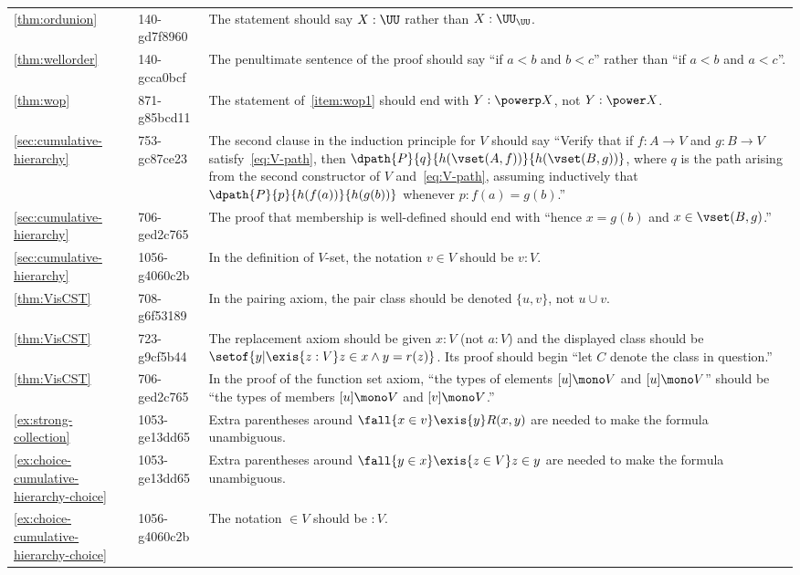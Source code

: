 \documentclass[
%
%
11pt %
]{article}
\begin{document}
\begin{longtable}{llp{10.5cm}}
  \cref{thm:ordunion}
  & 140-gd7f8960
  & The statement should say $X:\UU$ rather than $X:\UU_\UU$.\\
  \cref{thm:wellorder}
  & 140-gcca0bcf
  & The penultimate sentence of the proof should say ``if $a<b$ and $b<c$'' rather than ``if $a<b$ and $a<c$''.\\
  \cref{thm:wop}
  & 871-g85bcd11
  & The statement of~\ref{item:wop1} should end with $Y:\powerp X$, not $Y:\power X$.\\
  \cref{sec:cumulative-hierarchy}
  & 753-gc87ce23
  & The second clause in the induction principle for $V$ should say ``Verify that if $f : A \to V$ and $g : B \to V$ satisfy~\eqref{eq:V-path}, then $\dpath{P}{q}{h(\vset(A,f))}{h(\vset(B,g))}$, where $q$ is the path arising from the second constructor of $V$ and~\eqref{eq:V-path}, assuming inductively that $\dpath{P}{p}{h(f(a))}{h(g(b))}$ whenever $p:f(a)=g(b)$.''\\
  \cref{sec:cumulative-hierarchy}
  & 706-ged2c765
  & The proof that membership is well-defined should end with ``hence $x = g(b)$ and $x \in \vset(B,g)$.''\\
  \cref{sec:cumulative-hierarchy}
  & 1056-g4060c2b
  & In the definition of $V$-set, the notation $v \in V$ should be $v:V$.\\
  \cref{thm:VisCST}
  & 708-g6f53189
  & In the pairing axiom, the pair class should be denoted $\{u, v\}$, not $u\cup v$.\\
  \cref{thm:VisCST}
  & 723-g9cf5b44
  & The replacement axiom should be given $x : V$ (not $a : V$) and the displayed class should be $\setof{ y | \exis{z : V} z \in x \land y = r(z)}$.
  Its proof should begin ``let $C$ denote the class in question.''\\
  \cref{thm:VisCST}
  & 706-ged2c765
  & In the proof of the function set axiom, ``the types of elements $[u] \mono V$ and $[u] \mono V$'' should be ``the types of members $[u] \mono V$ and $[v] \mono V$.''\\
  \cref{ex:strong-collection}
  & 1053-ge13dd65
  & Extra parentheses around $\fall{x\in v}\exis{y} R(x,y)$ are needed to make the formula unambiguous.\\
  \cref{ex:choice-cumulative-hierarchy-choice}
  & 1053-ge13dd65
  & Extra parentheses around $\fall{y\in x}\exis{z\in V} z\in y$ are needed to make the formula unambiguous.\\
  \cref{ex:choice-cumulative-hierarchy-choice}
  & 1056-g4060c2b
  & The notation $\in V$ should be $:V$.\\

\end{longtable}
\end{document}
